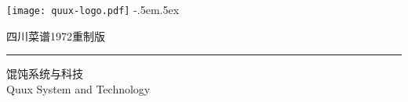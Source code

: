 \enlargethispage{9.596769mm}%

\begingroup%
\texttt{[image: quux-logo.pdf]}%
{\sffamily\tiny\kern-.5em\lower.5ex\hbox{\texttrademark}}%
\endgroup%

\vfill

\begin{flushright}
\singlespacing
\footnotesize%
\sffamily%
%
四川菜谱1972重制版%
	\mbox{\hspace{.87814pt}}%

\vspace{-.3125\baselineskip}%
\rule{73.11665pt}{1pt}%
\vspace{.1875\baselineskip}%

馄饨系统与科技%
	\mbox{\hspace{10.20990pt}}\\%
{\tiny Quux System and Technology}%
\end{flushright}

